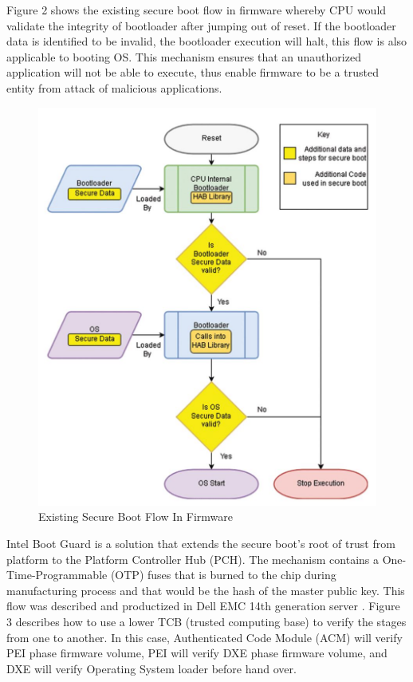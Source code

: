 \documentclass[review]{elsarticle}
\begin{document}
Figure 2 shows the existing secure boot flow in firmware whereby CPU would validate the integrity of bootloader after jumping out of reset. If the bootloader data is identified to be invalid, the bootloader execution will halt, this flow is also applicable to booting OS. This mechanism ensures that an unauthorized application will not be able to execute, thus enable firmware to be a trusted entity from attack of malicious applications. 

\begin{figure}[H]
	\centering
	\includegraphics[width=1\textwidth]{figs/ExistingSecureBootFlowInFirmware.JPG}
	\caption{Existing Secure Boot Flow In Firmware \cite{R5:15}}
\end{figure}

Intel Boot Guard is a solution that extends the secure boot’s root of trust from platform to the Platform Controller Hub (PCH). The mechanism contains a One-Time-Programmable (OTP) fuses that is burned to the chip during manufacturing process and that would be the hash of the master public key. This flow was described and productized in Dell EMC 14th generation server \cite{R5:14} . Figure 3 describes how to use a lower TCB (trusted computing base) to verify the stages from one to another. In this case, Authenticated Code Module (ACM) will verify PEI phase firmware volume, PEI will verify DXE phase firmware volume, and DXE will verify Operating System loader before hand over.
\end{document}
